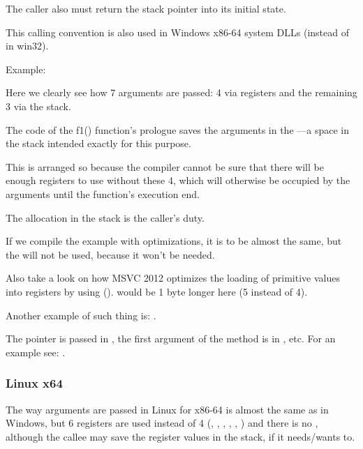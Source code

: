 The \gls{caller} also must return the \gls{stack pointer} into its initial state.

This calling convention is also used in Windows x86-64 system DLLs 
(instead of  in win32).

Example:






Here we clearly see how 7 arguments are passed: 4 via registers and the remaining 3 via the stack.

The code of the f1() function's prologue saves the arguments in the ---a space in the stack
intended exactly for this purpose.

This is arranged so because the compiler cannot be sure that there will be enough registers to use without these 4,
which will otherwise be occupied by the arguments until the function's execution end.

The  allocation in the stack is the caller's duty.



If we compile the example with optimizations, it is to be almost the same, 
but the  will not be used, because it won't be needed.

\label{using_MOV_and_pack_of_LEA_to_load_values}

Also take a look on how MSVC 2012 optimizes the loading of primitive values into registers by using \LEA ().
 would be 1 byte longer here (5 instead of 4).

Another example of such thing is: .


The \ITthis pointer is passed in \RCX, the first argument of the method is in \RDX, etc.
For an example see: .
 
\subsubsection{Linux x64}

The way arguments are passed in Linux for x86-64 is almost the same as in Windows, but 6 registers are
used instead of 4 (\RDI, \RSI, \RDX, \RCX, , ) and there is no , 
although the \gls{callee} may save the register values in the stack, if it needs/wants to.

